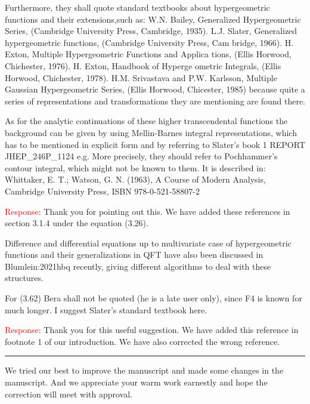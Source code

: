 \documentclass[12pt,superscriptaddress]{revtex4}
\begin{document}
\begin{center}
{
	\parbox{1\linewidth}
	{		
		 Furthermore, they shall quote standard textbooks about hypergeometric
 functions and their extensions,such as: W.N. Bailey, Generalized Hypergeometric Series, (Cambridge University Press, Cambridge, 1935). L.J. Slater,
 Generalized hypergeometric functions, (Cambridge University Press, Cam
bridge, 1966). H. Exton, Multiple Hypergeometric Functions and Applica
tions, (Ellis Horwood, Chichester, 1976). H. Exton, Handbook of Hyperge
ometric Integrals, (Ellis Horwood, Chichester, 1978). H.M. Srivastava and
 P.W. Karlsson, Multiple Gaussian Hypergeometric Series, (Ellis Horwood,
 Chicester, 1985) because quite a series of representations and transformations they are mentioning are found there.

 As for the analytic continuations of these higher transcendental functions
 the background can be given by using Mellin-Barnes integral representations,
 which has to be mentioned in explicit form and by referring to Slater’s book
 1
 REPORT JHEP\_246P\_1124
e.g. More precisely, they should refer to Pochhammer’s contour integral,
 which might not be known to them. It is described in: Whittaker, E. T.;
 Watson, G. N. (1963), A Course of Modern Analysis, Cambridge University
 Press, ISBN 978-0-521-58807-2

	}
}
\end{center}
\noindent\textcolor{red}{Response}:
Thank you for pointing out this. We have added these references in section 3.1.4 under the equation (3.26).


\begin{center}
{
	\parbox{1\linewidth}
	{		
  Difference and differential equations up to multivariate case of hypergeometric functions and their generalizations in QFT have also been discussed
 in Blumlein:2021hbq recently, giving different algorithms to deal with these
 structures.

 For (3.62) Bera shall not be quoted (he is a late user only), since F4 is
 known for much longer. I suggest Slater’s standard textbook here.

	}
}
\end{center}
\noindent\textcolor{red}{Response}:
Thank you for this useful suggestion. We have added this reference in footnote 1 of our introduction. We have also corrected the wrong reference.

\noindent\rule[0.25\baselineskip]{\textwidth}{1pt}




We tried our best to improve the manuscript and made some changes in the manuscript. And we appreciate your warm work earnestly and hope the correction will meet with approval.

	
% 
% 
	
	
\end{document}
